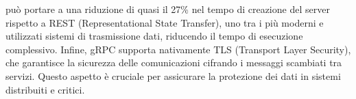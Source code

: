 può portare a una riduzione di quasi il 27\% nel tempo di creazione del server rispetto a REST (Representational State Transfer), uno tra i più moderni e utilizzati sistemi di trasmissione dati, riducendo il tempo di esecuzione complessivo.
Infine, gRPC supporta nativamente TLS (Transport Layer Security), che garantisce la sicurezza delle comunicazioni cifrando i messaggi scambiati tra servizi.
Questo aspetto è cruciale per assicurare la protezione dei dati in sistemi distribuiti e critici.

